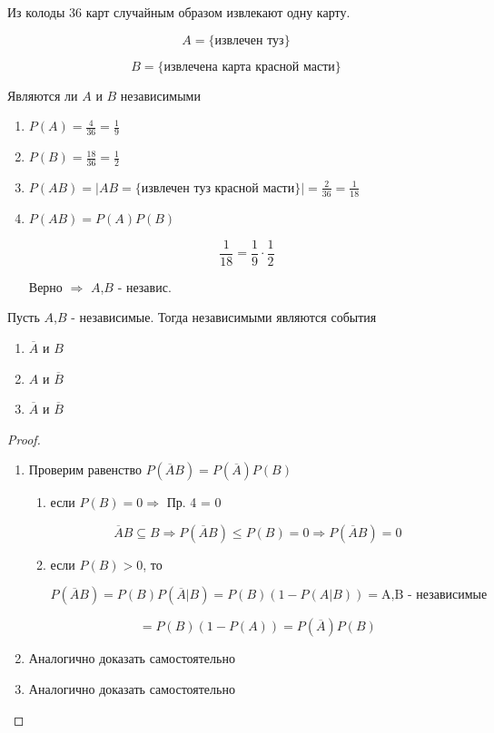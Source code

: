\documentclass[a4paper, 14pt]{report}
\begin{document}
Из колоды 36 карт случайным образом извлекают одну карту.

$$
A = \{ \text{извлечен туз} \}
$$

$$
B = \{ \text{извлечена карта красной масти} \}
$$

Являются ли $A$ и $B$ независимыми

\begin{enumerate}
    \item $P(A) = \frac{4}{36} = \frac{1}{9}$
    \item $P(B) = \frac{18}{36} = \frac{1}{2}$
    \item $P(AB) = | AB = \{ \text{извлечен туз красной масти} \} | = \frac{2}{36} = \frac{1}{18}$
    \item $P(AB) = P(A)P(B)$

        $$
        \frac{1}{18} = \frac{1}{9} \cdot \frac{1}{2}
        $$

        Верно $\Rightarrow$ $A$,$B$ - независ.
\end{enumerate}

\begin{theorem}
    Пусть $A$,$B$ - независимые. Тогда независимыми являются события

    \begin{enumerate}
        \item $\overline A$ и $B$
        \item $A$ и $\overline B$
        \item $\overline A$ и $\overline B$
    \end{enumerate}
\end{theorem}

\begin{proof}
    \begin{enumerate}
        \item Проверим равенство $P(\overline A B) = P(\overline A) P(B)$
        
            \begin{enumerate}
                \item если $P(B) = 0 \Rightarrow$ Пр. 4 = 0

                $$
                \overline A B \subseteq B \Rightarrow P(\overline A B) \le P(B) = 0 \Rightarrow P(\overline A B) = 0
                $$

            \item если $P(B) > 0$, то

                $$
                P(\overline A B) = P(B) P(\overline A | B) = P(B)(1-P(A|B)) = \text{A,B - независимые}
                $$

                $$
                = P(B)(1-P(A)) = P(\overline A)P(B)
                $$
            \end{enumerate}

        \item Аналогично доказать самостоятельно
        \item Аналогично доказать самостоятельно
    \end{enumerate}
\end{proof}
\end{document}
